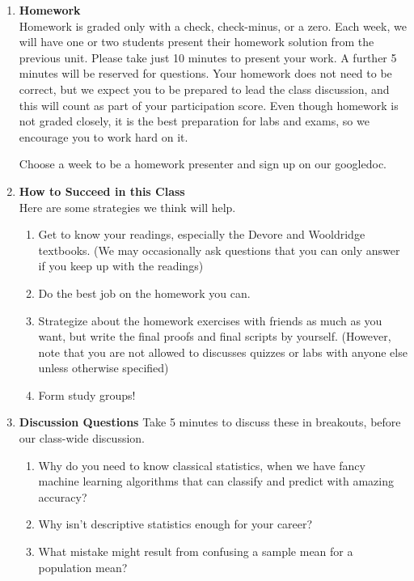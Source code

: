 \documentclass[12pt,a4paper]{article}
\numberwithin{equation}{subsection}
\begin{document}
\begin{enumerate}
\item \textbf{Homework}\\
Homework is graded only with a check, check-minus, or a zero.
Each week, we will have one or two students present their homework solution from the previous unit.
Please take just 10 minutes to present your work.  A further 5 minutes will be reserved for questions.  Your homework does not need to be correct, but we expect you to be prepared to lead the class discussion, and this will count as part of your participation score.  Even though homework is not graded closely, it is the best preparation for labs and exams, so we encourage you to work hard on it.

Choose a week to be a homework presenter and sign up on our googledoc.

\item \textbf{How to Succeed in this Class}\\
Here are some strategies we think will help.
\begin{enumerate}
\item Get to know your readings, especially the Devore and Wooldridge textbooks.  (We may occasionally ask questions that you can only answer if you keep up with the readings)
\item Do the best job on the homework you can.
\item Strategize about the homework exercises with friends as much as you want, but write the final proofs and final scripts by yourself.  (However, note that you are not allowed to discusses quizzes or labs with anyone else unless otherwise specified)
\item Form study groups!
\end{enumerate}

\item \textbf{Discussion Questions}
Take 5 minutes to discuss these in breakouts, before our class-wide discussion.
\begin{enumerate}
\item Why do you need to know classical statistics, when we have fancy machine learning algorithms that can classify and predict with amazing accuracy?
\item Why isn't descriptive statistics enough for your career?
\item What mistake might result from confusing a sample mean for a population mean?
\end{enumerate}


\end{enumerate}
\end{document}
